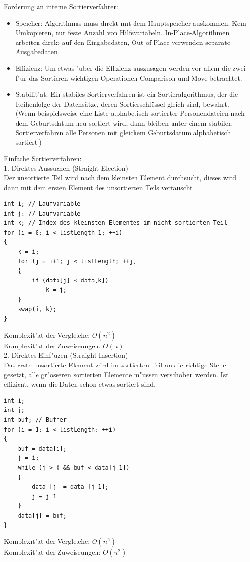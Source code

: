 Forderung an interne Sortierverfahren:\\
\begin{itemize}
\item Speicher: Algorithmus muss direkt mit dem Hauptspeicher auskommen. Kein Umkopieren, nur feste Anzahl von Hilfsvariabeln. In-Place-Algorithmen arbeiten direkt auf den Eingabedaten, Out-of-Place verwenden separate Ausgabedaten.
\item Effizienz: Um etwas "uber die Effizienz auszusagen werden vor allem die zwei f"ur das Sortieren wichtigen Operationen Comparison und Move betrachtet.
\item Stabilit"at: Ein stabiles Sortierverfahren ist ein Sortieralgorithmus, der die Reihenfolge der Datensätze, deren Sortierschlüssel gleich sind, bewahrt. (Wenn beispielsweise eine Liste alphabetisch sortierter Personendateien nach dem Geburtsdatum neu sortiert wird, dann bleiben unter einem stabilen Sortierverfahren alle Personen mit gleichem Geburtsdatum alphabetisch sortiert.)
\end{itemize}

Einfache Sortierverfahren:\\
1. Direktes Aussuchen (Straight Election)\\
Der unsortierte Teil wird nach dem kleinsten Element durchsucht, dieses wird dann mit dem ersten Element des unsortierten Teils vertauscht.\\
\begin{lstlisting}[style=C]
int i; // Laufvariable
int j; // Laufvariable
int k; // Index des kleinsten Elementes im nicht sortierten Teil
for (i = 0; i < listLength-1; ++i)
{
	k = i;
	for (j = i+1; j < listLength; ++j)
	{
		if (data[j] < data[k])
			k = j;
	}
	swap(i, k);
}
\end{lstlisting} 
Komplexit"at der Vergleiche: $O(n^2)$\\
Komplexit"at der Zuweiseungen: $O(n)$\\

2. Direktes Einf"ugen (Straight Insertion)\\
Das erste unsortierte Element wird im sortierten Teil an die richtige Stelle gesetzt, alle gr"osseren sortierten Elemente m"ussen verschoben werden.
Ist effizient, wenn die Daten schon etwas sortiert sind. 
\begin{lstlisting}[style=C]
int i;
int j;
int buf; // Buffer
for (i = 1; i < listLength; ++i)
{
	buf = data[i];
	j = i;
	while (j > 0 && buf < data[j-1])
	{
		data [j] = data [j-1];
		j = j-1;
	}
	data[j] = buf;
}
\end{lstlisting} 
Komplexit"at der Vergleiche: $O(n^2)$\\
Komplexit"at der Zuweiseungen: $O(n^2)$\\

